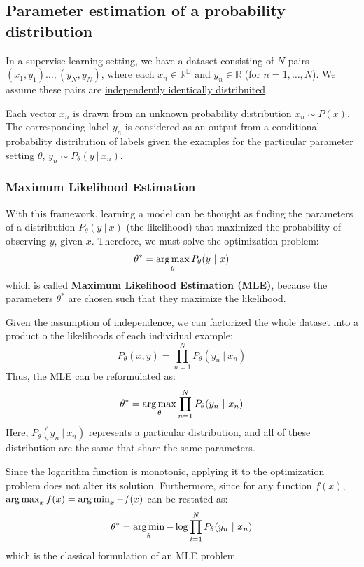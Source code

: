 \documentclass{article}
\begin{document}
\subsection{Parameter estimation of a probability distribution}
In a supervise learning setting, we have a dataset consisting of $N$ pairs\\
$(x_1,y_1)\ldots,(y_N,y_N)$, where each $x_n\in \mathbb{R^D}$ and $y_n\in
\mathbb{R}$ (for $n=1,\ldots,N$). We assume these pairs are
\underline{independently identically distribuited}.

Each vector $x_n$ is drawn from an unknown probability distribution $x_n\sim
P(x)$. The corresponding label $y_n$ is considered as an output from a
conditional probability distribution of labels given the examples for the
particular parameter setting $\theta$, $y_n\sim P_\theta(y\ |\ x_n)$.
\subsubsection{Maximum Likelihood Estimation}
With this framework, learning a model can be thought as finding the parameters
of a distribution $P_\theta(y\ |\ x)$ (the likelihood) that maximized the
probability of observing $y$, given $x$. Therefore, we must solve the
optimization problem: 
$$\theta^*=\argmax_{\theta}P_\theta(y\ |\ x)$$
which is called \textbf{Maximum Likelihood Estimation (MLE)}, because the
parameters $\theta^*$ are chosen such that they maximize the likelihood.

Given the assumption of independence, we can factorized the whole dataset
into a product o the likelihoods of each individual example: 
$$P_\theta(x,y)=\prod_{n=1}^NP_\theta(y_n\ |\ x_n)$$
Thus, the MLE can be reformulated as: 
$$\theta^*=\argmax_{\theta}\prod_{n=1}^NP_\theta(y_n\ |\ x_n)$$
Here, $P_\theta(y_n\ |\ x_n)$ represents a particular distribution, and all of
these distribution are the same that share the same parameters.

Since the logarithm function is monotonic, applying it to the optimization
problem does not alter its solution. Furthermore, since for any function
$f(x)$, $\operatorname*{arg\,max}_x f(x)=\operatorname*{arg\,min}_x -f(x)$ can be restated as:
$$\theta^*=\operatorname*{arg\,min}_{\theta}-\log\prod^{N}_{i=1} P_\theta(y_n\ |\
x_n)$$
which is the classical formulation of an MLE problem.
\end{document}
